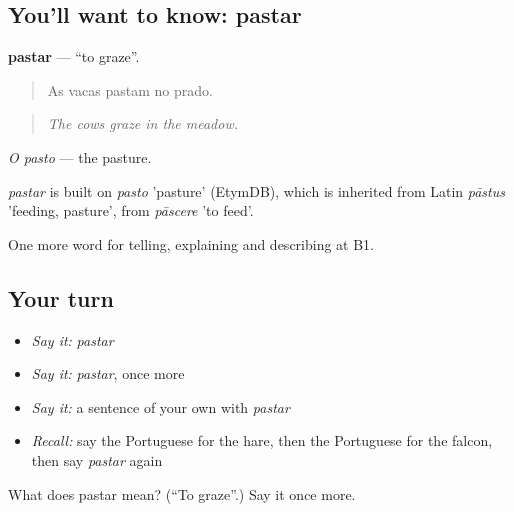 \subsection*{You'll want to know: pastar}
\textbf{pastar} — \textquotedblleft{}to graze\textquotedblright{}.

\begin{quote}
As vacas pastam no prado.
\end{quote}

\begin{quote}
\emph{The cows graze in the meadow.}
\end{quote}

\emph{O pasto} — the pasture.

\begin{cousinweb}
\emph{pastar} is built on \emph{pasto} 'pasture' (EtymDB), which is inherited from Latin \emph{pāstus} 'feeding, pasture', from \emph{pāscere} 'to feed'.
\end{cousinweb}

\begin{grammarlens}[title={What you've built}]
One more word for telling, explaining and describing at B1.
\end{grammarlens}

\subsection*{Your turn}
\begin{itemize}
\raggedright
  \item \emph{Say it:} \emph{pastar}
  \item \emph{Say it:} \emph{pastar}, once more
  \item \emph{Say it:} a sentence of your own with \emph{pastar}
  \item \emph{Recall:} say the Portuguese for the hare, then the Portuguese for the falcon, then say \emph{pastar} again
\end{itemize}

\begin{tcolorbox}[breakable,colback=teal!4,colframe=teal!35!black,title={Before you move on}]
What does pastar mean? (\textquotedblleft{}To graze\textquotedblright{}.) Say it once more.
\end{tcolorbox}
